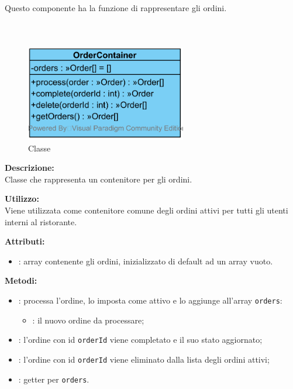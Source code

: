 Questo componente ha la funzione di rappresentare gli ordini.

\subparagraph[::OrderContainer]{\class}\mbox{}\\ \label{\class}
\begin{figure}[H]
	\centering
	\includegraphics[width=7cm]{./diagrammi/demo/server/order/ordercontainer.png}
	\caption{Classe \class}
\end{figure}
\textbf{Descrizione:}\\
Classe che rappresenta un contenitore per gli ordini.

\textbf{Utilizzo:}\\
Viene utilizzata come contenitore comune degli ordini attivi per tutti gli utenti interni al ristorante.

%

\textbf{Attributi:}
\begin{itemize}
	\item {}: array contenente gli ordini, inizializzato di default ad un array vuoto.
\end{itemize}

\textbf{Metodi:}
\begin{itemize}
	\item {}: processa l'ordine, lo imposta come attivo e lo aggiunge all'array \texttt{orders}:
	\begin{itemize}
		\item {}: il nuovo ordine da processare;
	\end{itemize}
	\item {}: l'ordine con id \texttt{orderId} viene completato e il suo stato aggiornato;
	\item {}: l'ordine con id \texttt{orderId} viene eliminato dalla lista degli ordini attivi;
	\item {}: getter per \texttt{orders}.
\end{itemize}


